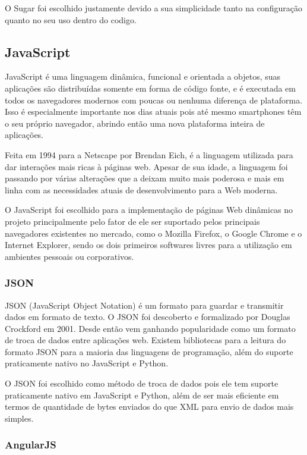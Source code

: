 \documentclass[
	article,			%
	11pt,				%
	oneside,			%
	a4paper,			%
	english,			%
	brazil,				%
	sumario=tradicional
	]{abntex2}
\begin{document}
O Sugar foi escolhido justamente devido a sua simplicidade tanto na configuração quanto no seu uso dentro do codigo.

\subsection{JavaScript}

JavaScript é uma linguagem dinâmica, funcional e orientada a objetos, suas aplicações são distribuídas somente em forma de código fonte, e é executada em todos os navegadores modernos com poucas ou nenhuma diferença de plataforma.
Isso é especialmente importante nos dias atuais pois até mesmo smartphones têm o seu próprio navegador, abrindo então uma nova plataforma inteira de aplicações.

Feita em 1994 para a Netscape por Brendan Eich, é a linguagem utilizada para dar interações mais ricas à páginas web.
Apesar de sua idade, a linguagem foi passando por várias alterações que a deixam muito mais poderosa e mais em linha com as necessidades atuais de desenvolvimento para a Web moderna.

O JavaScript foi escolhido para a implementação de páginas Web dinâmicas no projeto principalmente pelo fator de ele ser suportado pelos principais navegadores existentes no mercado, como o Mozilla Firefox, o Google Chrome e o Internet Explorer, sendo os dois primeiros softwares livres para a utilização em ambientes pessoais ou corporativos.

\subsubsection{JSON}

JSON (JavaScript Object Notation) é um formato para guardar e transmitir dados em formato de texto.
O JSON foi descoberto e formalizado por Douglas Crockford em 2001. \cite{json}
Desde então vem ganhando popularidade como um formato de troca de dados entre aplicações web.
Existem bibliotecas para a leitura do formato JSON para a maioria das linguagens de programação, além do suporte praticamente nativo no JavaScript e Python.

O JSON foi escolhido como método de troca de dados pois ele tem suporte praticamente nativo em JavaScript e Python, além de ser mais eficiente em termos de quantidade de bytes enviados do que XML para envio de dados mais simples.

\subsubsection{AngularJS}
\end{document}
